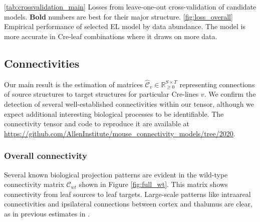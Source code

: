 \begin{table}[H]
{\label{tab:crossvalidation_main}
}
\caption{\ref{tab:crossvalidation_main} Losses from leave-one-out cross-validation of candidate models.
\textbf{Bold} numbers are best for their major structure.
\ref{fig:loss_overall} Empirical performance of selected EL model by data abundance.
The model is more accurate in Cre-leaf combinations where it draws on more data.}
\end{table}

\subsection{Connectivities}

Our main result is the estimation of matrices $\hat {\mathcal C}_v \in \mathbb R_{\geq 0}^{S \times T}$ representing connections of source structures to target structures for particular Cre-lines $v$. 
We confirm the detection of several well-established connectivities within our tensor, although we expect additional interesting biological processes to be identifiable.
The connectivity tensor and code to reproduce it are available at \url{https://github.com/AllenInstitute/mouse_connectivity_models/tree/2020}.

\subsubsection{Overall connectivity}

Several known biological projection patterns are evident in the wild-type connectivity matrix $\mathcal C_{wt}$ shown in Figure \ref{fig:full_wt}.
This matrix shows connectivity from leaf sources to leaf targets.
Large-scale patterns like intraareal connectivities and ipsilateral connections between cortex and thalumus are clear, as in previous estimates in \citet{Oh2014-kh, Knox2019-ot, Harris2019-mr}.

